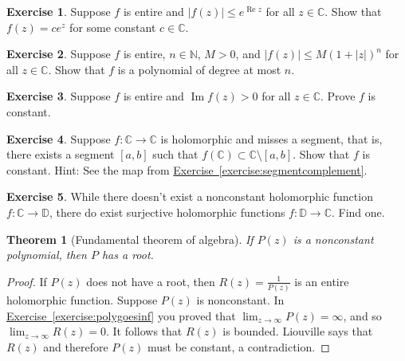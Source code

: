\documentclass[12pt,openany]{book}
\renewcommand{\Re}{\operatorname{Re}}
\renewcommand{\Im}{\operatorname{Im}}
\newcommand{\sabs}[1]{\lvert {#1} \rvert}
\newcommand{\C}{{\mathbb{C}}}
\newcommand{\N}{{\mathbb{N}}}
\newcommand{\D}{{\mathbb{D}}}
\theoremstyle{plain}
\newtheorem{thm}{Theorem}[section]
\theoremstyle{remark}
\theoremstyle{definition}
\newenvironment{exbox}{%
    \def\FrameCommand{\vrule width 1pt \relax\hspace{10pt}}%
    \MakeFramed{\advance\hsize-\width\FrameRestore}%
}{%
    \endMakeFramed
}
\theoremstyle{exercise}
\newtheorem{exercise}{Exercise}[section]
\theoremstyle{example}
\newcommand{\exerciseref}[1]{\hyperref[#1]{Exercise~\ref*{#1}}}
\begin{document}
\begin{exbox}
\begin{exercise}
Suppose $f$ is entire and $\sabs{f(z)} \leq e^{\Re z}$ for all $z \in
\C$.  Show that $f(z) = c e^z$ for some constant $c \in \C$.
\end{exercise}

\begin{exercise}
Suppose $f$ is entire, $n \in \N$, $M > 0$, and
$\sabs{f(z)} \leq M {(1+\sabs{z})}^n$ for all $z \in \C$.
Show that $f$ is a polynomial of degree at most $n$.
\end{exercise}

\begin{exercise}
Suppose $f$ is entire and $\Im f(z) > 0$ for all $z \in \C$.
Prove $f$ is constant.
\end{exercise}

\begin{exercise}
Suppose $f \colon \C \to \C$ is holomorphic and misses a segment,
that is, there exists a segment
$[a,b]$ such that $f(\C) \subset \C \setminus [a,b]$.
Show that $f$ is constant.  Hint: See the map from
\exerciseref{exercise:segmentcomplement}.
\end{exercise}

\begin{exercise}
While there doesn't exist a nonconstant holomorphic function $f \colon \C
\to \D$, there do exist surjective holomorphic functions $f \colon \D \to
\C$.  Find one.
\end{exercise}
\end{exbox}

\begin{thm}[Fundamental theorem of algebra]
If $P(z)$ is a nonconstant polynomial, then $P$ has a root.
\end{thm}

\begin{proof}
If $P(z)$ does not have a root, then $R(z) = \frac{1}{P(z)}$ is
an entire holomorphic function.
Suppose $P(z)$ is nonconstant.
In \exerciseref{exercise:polygoesinf} you proved that
$\lim_{z \to \infty} P(z) = \infty$, and so
$\lim_{z \to \infty} R(z) = 0$.  It follows that $R(z)$ is bounded.
Liouville says that $R(z)$ and therefore $P(z)$ must be constant, a
contradiction.
\end{proof}
\end{document}
